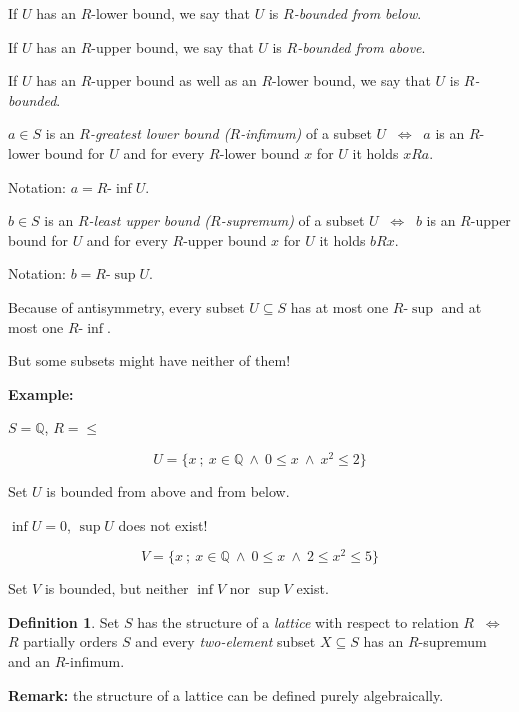 \documentclass[11pt,paper=b5,footinclude,headinclude]{scrbook} %
\def\inn {{~\wedge~}}
\def\cee {{~\Leftrightarrow~}}
\theoremstyle{remark}
\theoremstyle{definition} %
\newtheorem*{definition}{Definition}
\theoremstyle{theorem} %
\begin{document}
\bigskip
If $U$ has an $R$-lower bound, we say that $U$ is {\em $R$-bounded from below}.

\bigskip
If $U$ has an $R$-upper bound, we say that $U$ is {\em $R$-bounded from above}.

\bigskip
If $U$ has an $R$-upper bound as well as an $R$-lower bound, we say that
$U$ is {\em $R$-bounded}.

\bigskip
$a\in S$ is an {\em $R$-greatest lower bound ($R$-infimum)} of a subset $U$
$\cee$ $a$ is an $R$-lower bound for $U$ and for every $R$-lower bound $x$ for $U$ it holds $xRa$.

Notation: $a = R$-$\inf U$.

\bigskip
$b\in S$ is an {\em $R$-least upper bound ($R$-supremum)} of a subset $U$
$\cee$ $b$ is an $R$-upper bound for $U$ and for every $R$-upper bound $x$ for $U$ it holds $bRx$.

Notation: $b = R$-$\sup U$.

\bigskip
Because of antisymmetry, every subset $U\subseteq S$ has at most one $R$-$\sup$
and at most one $R$-$\inf$.

But some subsets might have neither of them!

\bigskip
\textbf{ Example:}

$S = \mathbb{Q}$, $R = \le$

$$U = \{x~;~x\in \mathbb{Q}\inn 0\le x \inn x^2\le 2\}$$

Set $U$ is bounded from above and from below.

$\inf U = 0$, $\sup U$ does not exist!

\medskip
$$V = \{x~;~x\in \mathbb{Q}\inn 0\le x \inn 2\le x^2\le 5\}$$

Set $V$ is bounded, but neither $\inf V$ nor $\sup V$ exist.

\begin{definition}
Set $S$ has the structure of a {\em lattice} with respect to relation $R$ $\cee$
$R$ partially orders $S$ and every {\em two-element} subset $X\subseteq S$
has an $R$-supremum and an $R$-infimum.
\end{definition}

\textbf{Remark:} the structure of a lattice can be defined purely algebraically.
\end{document}
